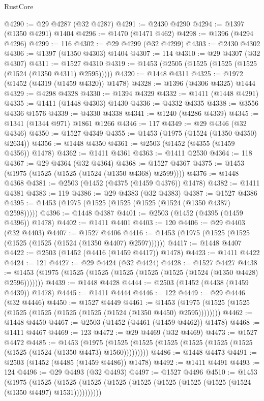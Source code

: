 \begin{lexlean}{RustCore}
\begin{coremodule}
@4290 := @29 @4287 (@32 @4287)
@4291 := @2430 @4290
@4294 := @1397 (@1350 @4291) @1404
@4296 := @1470 (@1471 @462)
@4298 := @1396 (@4294 @4296)
@4299 := 116
@4302 := @29 @4299 (@32 @4299)
@4303 := @2430 @4302
@4306 := @1397 (@1350 @4303) @1404
@4307 := 114
@4310 := @29 @4307 (@32 @4307)
@4311 := @1527 @4310
@4319 := @1453 (@2505 (@1525 (@1525 (@1525 (@1524 (@1350 @4311) @2595)))))
@4320 := @1448 @4311
@4325 := @1972 (@1452 (@4319 (@1459 @4320)) @1478)
@4328 := @1396 (@4306 @4325) @1444
@4329 := @4298 @4328
@4330 := @1394 @4329
@4332 := @1411 (@1448 @4291)
@4335 := @1411 (@1448 @4303) @1430
@4336 := @4332 @4335
@4338 := @3556 @4336 @1576
@4339 := @4330 @4338
@4341 := @1240 (@4286 @4339)
@4345 := @1341 (@1344 @971) @1861 @1266
@4346 := 117
@4349 := @29 @4346 (@32 @4346)
@4350 := @1527 @4349
@4355 := @1453 (@1975 (@1524 (@1350 @4350) @2634))
@4356 := @1448 @4350
@4361 := @2503 (@1452 (@4355 (@1459 @4356)) @1478)
@4362 := @1411 @4361
@4363 := @1411 @2530
@4364 := 118
@4367 := @29 @4364 (@32 @4364)
@4368 := @1527 @4367
@4375 := @1453 (@1975 (@1525 (@1525 (@1524 (@1350 @4368) @2599))))
@4376 := @1448 @4368
@4381 := @2503 (@1452 (@4375 (@1459 @4376)) @1478)
@4382 := @1411 @4381
@4383 := 119
@4386 := @29 @4383 (@32 @4383)
@4387 := @1527 @4386
@4395 := @1453 (@1975 (@1525 (@1525 (@1525 (@1524 (@1350 @4387) @2598)))))
@4396 := @1448 @4387
@4401 := @2503 (@1452 (@4395 (@1459 @4396)) @1478)
@4402 := @1411 @4401
@4403 := 120
@4406 := @29 @4403 (@32 @4403)
@4407 := @1527 @4406
@4416 := @1453 (@1975 (@1525 (@1525 (@1525 (@1525 (@1524 (@1350 @4407) @2597))))))
@4417 := @1448 @4407
@4422 := @2503 (@1452 (@4416 (@1459 @4417)) @1478)
@4423 := @1411 @4422
@4424 := 121
@4427 := @29 @4424 (@32 @4424)
@4428 := @1527 @4427
@4438 := @1453 (@1975 (@1525 (@1525 (@1525 (@1525 (@1525 (@1524 (@1350 @4428) @2596)))))))
@4439 := @1448 @4428
@4444 := @2503 (@1452 (@4438 (@1459 @4439)) @1478)
@4445 := @1411 @4444
@4446 := 122
@4449 := @29 @4446 (@32 @4446)
@4450 := @1527 @4449
@4461 := @1453 (@1975 (@1525 (@1525 (@1525 (@1525 (@1525 (@1525 (@1524 (@1350 @4450) @2595))))))))
@4462 := @1448 @4450
@4467 := @2503 (@1452 (@4461 (@1459 @4462)) @1478)
@4468 := @1411 @4467
@4469 := 123
@4472 := @29 @4469 (@32 @4469)
@4473 := @1527 @4472
@4485 := @1453
    (@1975 (@1525 (@1525 (@1525 (@1525 (@1525 (@1525 (@1525 (@1524 (@1350 @4473) @1560)))))))))
@4486 := @1448 @4473
@4491 := @2503 (@1452 (@4485 (@1459 @4486)) @1478)
@4492 := @1411 @4491
@4493 := 124
@4496 := @29 @4493 (@32 @4493)
@4497 := @1527 @4496
@4510 := @1453
    (@1975
      (@1525 (@1525 (@1525 (@1525 (@1525 (@1525 (@1525 (@1525 (@1524 (@1350 @4497) @1531))))))))))

\end{coremodule}
\end{lexlean}
